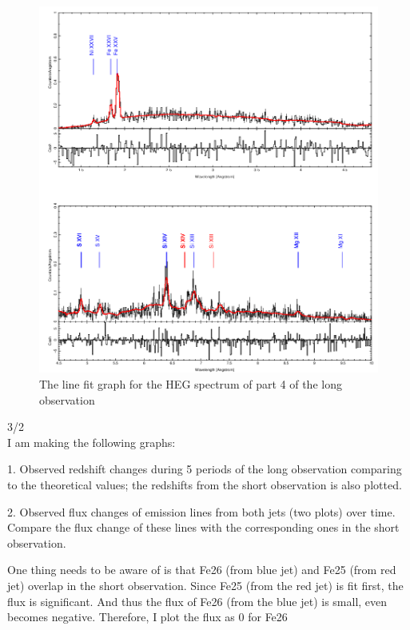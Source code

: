\begin{figure}[h!]
    \centering
    \includegraphics[width=\linewidth]{Chapters/Figures/part4_heg.png}
    \caption{The line fit graph for the HEG spectrum of part 4 of the long observation}
    \label{fig:part4}
\end{figure}



3/2\\
I am making the following graphs:\par
1. Observed redshift changes during 5 periods of the long observation comparing to the theoretical values; the redshifts from the short observation is also plotted.\par
2. Observed flux changes of emission lines from both jets (two plots) over time. Compare the flux change of these lines with the corresponding ones in the short observation.\par

One thing needs to be aware of is that Fe26 (from blue jet) and Fe25 (from red jet) overlap in the short observation. Since Fe25 (from the red jet) is fit first, the flux is significant. And thus the flux of Fe26 (from the blue jet) is small, even becomes negative. Therefore, I plot the flux as 0 for Fe26\par

